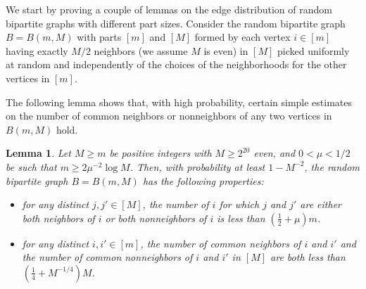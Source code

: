 \documentclass[11pt]{article}
\newtheorem{lemma}{Lemma}[section]
\begin{document}
We start by proving a couple of lemmas on the edge distribution of random
bipartite graphs with different part sizes. Consider the random bipartite graph
$B=B(m,M)$ with parts $[m]$ and $[M]$ formed by each vertex
$i \in [m]$ having exactly $M/2$ neighbors (we assume $M$ is even) in $[M]$
picked uniformly at random and independently of the choices of the
neighborhoods for the other vertices in $[m]$.

The following lemma shows that, with high probability, certain simple estimates on the number of common neighbors or nonneighbors of any two vertices in $B(m, M)$ hold.

\begin{lemma}\label{firstlemma1}
Let $M \geq m$ be positive integers with $M \geq 2^{20}$ even, and $0<\mu<1/2$ be such
that $m \geq 2\mu^{-2}\log M$. Then, with probability at least $1-M^{-2}$, the
random bipartite graph $B=B(m,M)$ has the following properties:
\begin{itemize}
\item for any distinct $j,j'
\in [M]$, the number of $i$ for which $j$ and $j'$ are either both neighbors of
$i$ or both nonneighbors of $i$ is less than $(\frac{1}{2}+\mu)m$.
\item for any distinct $i,i' \in [m]$, the number of common neighbors of $i$
and $i'$ and the number of common nonneighbors of $i$ and $i'$ in $[M]$ are
both less than $\left(\frac{1}{4}+M^{-1/4}\right)M$.
\end{itemize}
\end{lemma}
\end{document}
